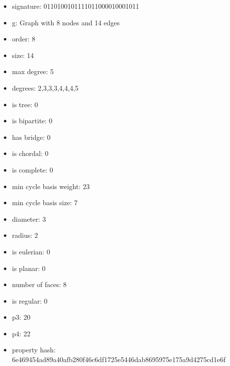\begin{itemize}
\item signature: 0110100101111011000010001011
\item g: Graph with 8 nodes and 14 edges
\item order: 8
\item size: 14
\item max degree: 5
\item degrees: 2,3,3,3,4,4,4,5
\item is tree: 0
\item is bipartite: 0
\item has bridge: 0
\item is chordal: 0
\item is complete: 0
\item min cycle basis weight: 23
\item min cycle basis size: 7
\item diameter: 3
\item radius: 2
\item is eulerian: 0
\item is planar: 0
\item number of faces: 8
\item is regular: 0
\item p3: 20
\item p4: 22
\item property hash: 6e469454ad89a40afb280f46c6df1725e5446dab8695975e175a9d4275cd1e6f
\end{itemize}
\newpage
\begin{figure}
\end{figure}
